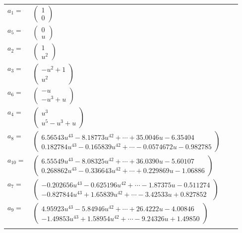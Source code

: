 \documentclass[1p]{elsarticle_modified}
\theoremstyle{definition}
\begin{document}
\begin{tabular}{m{7pt} m{180pt} m{7pt} m{180pt} }
\flushright $a_{1}=$&$\begin{pmatrix}1\\0\end{pmatrix}$ \\
\flushright $a_{5}=$&$\begin{pmatrix}0\\u\end{pmatrix}$ \\
\flushright $a_{2}=$&$\begin{pmatrix}1\\u^2\end{pmatrix}$ \\
\flushright $a_{3}=$&$\begin{pmatrix}- u^2+1\\u^2\end{pmatrix}$ \\
\flushright $a_{6}=$&$\begin{pmatrix}- u\\- u^3+u\end{pmatrix}$ \\
\flushright $a_{4}=$&$\begin{pmatrix}u^3\\u^5- u^3+u\end{pmatrix}$ \\
\flushright $a_{8}=$&$\begin{pmatrix}6.56543 u^{43}-8.18773 u^{42}+\cdots+35.0046 u-6.35404\\0.182784 u^{43}-0.165839 u^{42}+\cdots-0.0574672 u-0.982785\end{pmatrix}$ \\
\flushright $a_{10}=$&$\begin{pmatrix}6.55549 u^{43}-8.08325 u^{42}+\cdots+36.0390 u-5.60107\\0.268862 u^{43}-0.336643 u^{42}+\cdots+0.229869 u-1.06886\end{pmatrix}$ \\
\flushright $a_{7}=$&$\begin{pmatrix}-0.202656 u^{43}-0.625196 u^{42}+\cdots-1.87375 u-0.511274\\-0.827844 u^{43}+1.65839 u^{42}+\cdots-3.42533 u+0.827852\end{pmatrix}$ \\
\flushright $a_{9}=$&$\begin{pmatrix}4.95923 u^{43}-5.84946 u^{42}+\cdots+26.4222 u-4.00846\\-1.49853 u^{43}+1.58954 u^{42}+\cdots-9.24326 u+1.49850\end{pmatrix}$\\&\end{tabular}
\end{document}
